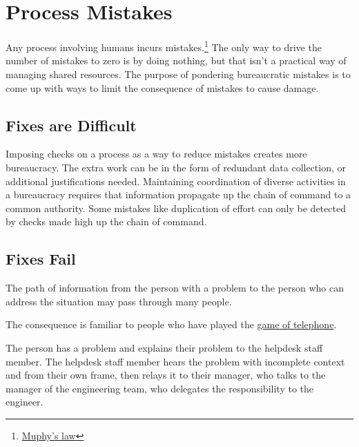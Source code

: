 \section{Process Mistakes\label{sec:process-mistakes}}

Any process involving humans incurs mistakes.\footnote{\href{https://en.wikipedia.org/wiki/Murphy\%27s_law}{Muphy's law}
} The only way to drive the number of mistakes to zero is by doing nothing, but that isn't a practical way of managing shared resources. 
The purpose of pondering bureaucratic mistakes is to come up with ways to limit the consequence of mistakes to cause damage. 

\subsection*{Fixes are Difficult}
Imposing checks on a process as a way to  reduce mistakes creates more bureaucracy. The extra work can be in the form of redundant data collection, or additional justifications needed. 
Maintaining coordination of diverse activities in a bureaucracy requires that information propagate up the chain of command to a common authority. Some mistakes like duplication of effort can only be detected by checks made high up the chain of command.


\subsection*{Fixes Fail}
The path of information from the person with a problem to the person who can address the situation may pass through many people. 

The consequence is familiar to people who have played the \href{https://en.wikipedia.org/wiki/Chinese_whispers\%23Game}{game of telephone}.
\begin{mdframed}[frametitle={Game of Telephone},frametitlerule=true,frametitlealignment=\centering]
The person has a problem and explains their problem to the helpdesk staff member. The helpdesk staff member hears the problem with incomplete context and from their own frame, then relays it to their manager, who talks to the manager of the engineering team, who delegates the responsibility to the engineer. 
\end{mdframed}

